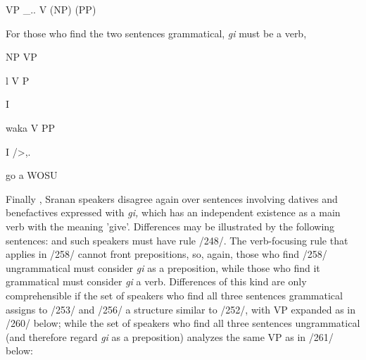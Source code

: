 \ea\label{ex:2:252}
\z

\ea\label{ex:2:259}
 VP \_.. V (NP) (PP)
\glt
\z


For those who find the two sentences grammatical,
\textit{gi} must be a verb,

\ea
NP VP

l V P

I

waka V PP

I /{\textquotedbl}{\textgreater},.

go a WOSU
\z

Finally , Sranan speakers disagree again over sentences involving datives and benefactives expressed with \textit{gi,} which has an independent existence as a main verb with the meaning 'give'. Differences may be illustrated by the following sentences:
and such speakers must have rule /248/. The verb-focusing rule that applies in /258/ cannot front prepositions, so, again, those who find /258/ 
 ungrammatical must consider \textit{gi} as a preposition, while those who find it grammatical must consider \textit{gi} a verb. Differences of this kind are only comprehensible if the set of speakers who find all three sentences grammatical assigns to /253/ and /256/ a structure similar to
/252/, with VP expanded as in /260/ below; while the set of speakers who find all three sentences ungrammatical (and therefore regard \textit{gi} as a preposition) analyzes the same VP as in /261/ below:

